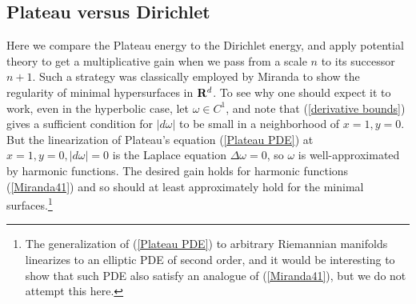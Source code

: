 \subsection{Plateau versus Dirichlet}

Here we compare the Plateau energy to the Dirichlet energy, and apply potential theory to get a multiplicative gain when we pass from a scale $n$ to its successor $n + 1$.
Such a strategy was classically employed by Miranda \cite[Teorema 4.3]{Miranda66} to show the regularity of minimal hypersurfaces in $\mathbf{R}^d$.
To see why one should expect it to work, even in the hyperbolic case, let $\omega \in C^1$, and note that (\ref{derivative bounds}) gives a sufficient condition for $|d\omega|$ to be small in a neighborhood of $x = 1, y = 0$.
But the linearization of Plateau's equation (\ref{Plateau PDE}) at $x = 1, y = 0, |d\omega| = 0$ is the Laplace equation $\Delta \omega = 0$, so $\omega$ is well-approximated by harmonic functions.
The desired gain holds for harmonic functions (\ref{Miranda41}) and so should at least approximately hold for the minimal surfaces.\footnote{The generalization of (\ref{Plateau PDE}) to arbitrary Riemannian manifolds linearizes to an elliptic PDE of second order, and it would be interesting to show that such PDE also satisfy an analogue of (\ref{Miranda41}), but we do not attempt this here.}

